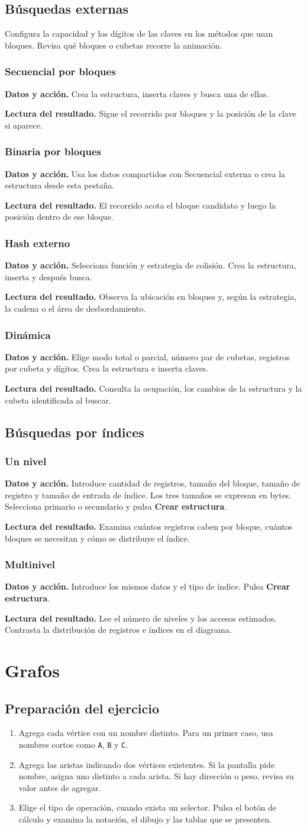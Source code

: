 \documentclass[11pt,a4paper]{report}
\newcommand{\boton}[1]{\textbf{#1}}
\newcommand{\pasos}{\begin{enumerate}}
\newcommand{\finpasos}{\end{enumerate}}
\newcommand{\metodo}[3]{\subsection{#1}\textbf{Datos y acción.} #2\par\textbf{Lectura del resultado.} #3}
\begin{document}
\section{Búsquedas externas}
Configura la capacidad y los dígitos de las claves en los métodos que usan bloques. Revisa qué bloques o cubetas recorre la animación.
\metodo{Secuencial por bloques}{Crea la estructura, inserta claves y busca una de ellas.}{Sigue el recorrido por bloques y la posición de la clave si aparece.}
\metodo{Binaria por bloques}{Usa los datos compartidos con Secuencial externa o crea la estructura desde esta pestaña.}{El recorrido acota el bloque candidato y luego la posición dentro de ese bloque.}
\metodo{Hash externo}{Selecciona función y estrategia de colisión. Crea la estructura, inserta y después busca.}{Observa la ubicación en bloques y, según la estrategia, la cadena o el área de desbordamiento.}
\metodo{Dinámica}{Elige modo total o parcial, número par de cubetas, registros por cubeta y dígitos. Crea la estructura e inserta claves.}{Consulta la ocupación, los cambios de la estructura y la cubeta identificada al buscar.}

\section{Búsquedas por índices}
\metodo{Un nivel}{Introduce cantidad de registros, tamaño del bloque, tamaño de registro y tamaño de entrada de índice. Los tres tamaños se expresan en bytes. Selecciona primario o secundario y pulsa \boton{Crear estructura}.}{Examina cuántos registros caben por bloque, cuántos bloques se necesitan y cómo se distribuye el índice.}
\metodo{Multinivel}{Introduce los mismos datos y el tipo de índice. Pulsa \boton{Crear estructura}.}{Lee el número de niveles y los accesos estimados. Contrasta la distribución de registros e índices en el diagrama.}

\chapter{Grafos}
\section{Preparación del ejercicio}
\pasos
\item Agrega cada vértice con un nombre distinto. Para un primer caso, usa nombres cortos como \texttt{A}, \texttt{B} y \texttt{C}.
\item Agrega las aristas indicando dos vértices existentes. Si la pantalla pide nombre, asigna uno distinto a cada arista. Si hay dirección o peso, revisa su valor antes de agregar.
\item Elige el tipo de operación, cuando exista un selector. Pulsa el botón de cálculo y examina la notación, el dibujo y las tablas que se presenten.
\finpasos
\end{document}
